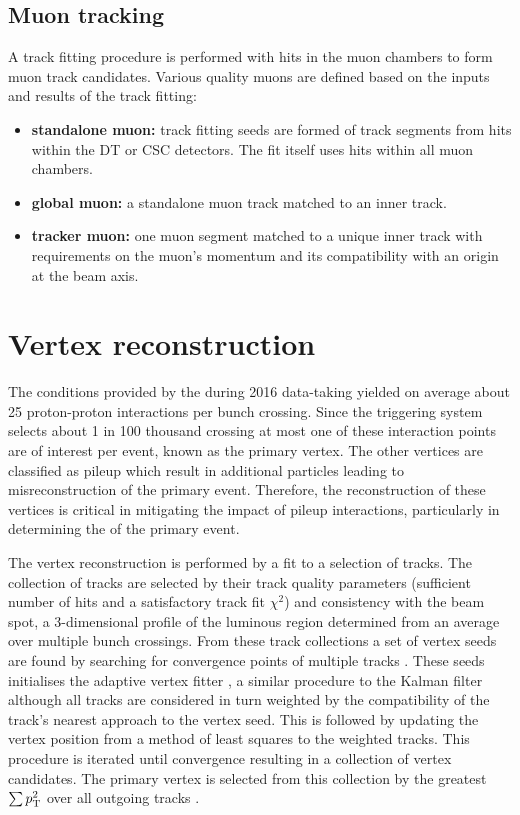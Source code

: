 \subsection{Muon tracking}\label{subsec:muon-tracking}

A track fitting procedure is performed with hits in the muon chambers to form
muon track candidates. Various quality muons are defined based on the inputs
and results of the track fitting:

\begin{itemize}
    \item \textbf{standalone muon:} track fitting seeds are formed of track
    segments from hits within the DT or CSC detectors. The fit itself uses
    hits within all muon chambers.
    \item \textbf{global muon:} a standalone muon track matched to an inner
    track.
    \item \textbf{tracker muon:} one muon segment matched to a unique inner
    track with requirements on the muon's momentum and its compatibility with
    an origin at the beam axis.
\end{itemize}


\section{Vertex reconstruction}\label{sec:vertex-reco}

The conditions provided by the \LHC during 2016 data-taking yielded on average
about 25 proton-proton interactions per bunch crossing. Since the triggering
system selects about 1 in 100 thousand crossing at most one of these
interaction points are of interest per event, known as the primary vertex. The
other vertices are classified as pileup which result in additional particles
leading to misreconstruction of the primary event. Therefore, the reconstruction
of these vertices is critical in mitigating the impact of pileup interactions,
particularly in determining the \ptmiss of the primary event.

The vertex reconstruction is performed by a fit to a selection of tracks. The
collection of tracks are selected by their track quality parameters
(sufficient number of hits and a satisfactory track fit $\chi^2$) and
consistency with the beam spot, a 3-dimensional profile of the luminous
region determined from an average over multiple bunch crossings. From these
track collections a set of vertex seeds are found by searching for convergence
points of multiple tracks \cite{Speer:927395}. These seeds initialises the
adaptive vertex fitter \cite{Fruhwirth:1027031}, a similar procedure to the
Kalman filter although all tracks are considered in turn weighted by the
compatibility of the track's nearest approach to the vertex seed. This is
followed by updating the vertex position from a method of least squares to the
weighted tracks. This procedure is iterated until convergence resulting in a
collection of vertex candidates. The primary vertex is selected from this
collection by the greatest $\sum p_{\text{T}}^2$ over all outgoing tracks
\cite{Sirunyan:2017ulk}.


